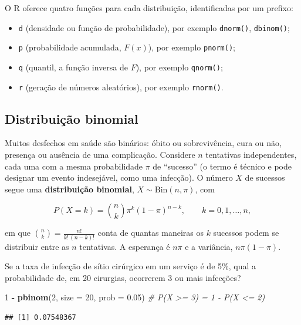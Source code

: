 \documentclass[
]{book}
\newenvironment{Shaded}{\begin{snugshade}}{\end{snugshade}}
\newcommand{\AttributeTok}[1]{\textcolor[rgb]{0.13,0.29,0.53}{#1}}
\newcommand{\CommentTok}[1]{\textcolor[rgb]{0.56,0.35,0.01}{\textit{#1}}}
\newcommand{\DecValTok}[1]{\textcolor[rgb]{0.00,0.00,0.81}{#1}}
\newcommand{\FloatTok}[1]{\textcolor[rgb]{0.00,0.00,0.81}{#1}}
\newcommand{\FunctionTok}[1]{\textcolor[rgb]{0.13,0.29,0.53}{\textbf{#1}}}
\newcommand{\NormalTok}[1]{#1}
\newcommand{\SpecialCharTok}[1]{\textcolor[rgb]{0.81,0.36,0.00}{\textbf{#1}}}
\providecommand{\tightlist}{%
  \setlength{\itemsep}{0pt}\setlength{\parskip}{0pt}}
\begin{document}
O R oferece quatro funções para cada distribuição, identificadas por um prefixo:

\begin{itemize}
\tightlist
\item
  \texttt{d} (densidade ou função de probabilidade), por exemplo \texttt{dnorm()}, \texttt{dbinom()};
\item
  \texttt{p} (probabilidade acumulada, \(F(x)\)), por exemplo \texttt{pnorm()};
\item
  \texttt{q} (quantil, a função inversa de \(F\)), por exemplo \texttt{qnorm()};
\item
  \texttt{r} (geração de números aleatórios), por exemplo \texttt{rnorm()}.
\end{itemize}

\subsection{Distribuição binomial}\label{distribuiuxe7uxe3o-binomial}

Muitos desfechos em saúde são binários: óbito ou sobrevivência, cura ou não, presença ou ausência de uma complicação. Considere \(n\) tentativas independentes, cada uma com a mesma probabilidade \(\pi\) de ``sucesso'' (o termo é técnico e pode designar um evento indesejável, como uma infecção). O número \(X\) de sucessos segue uma \textbf{distribuição binomial}, \(X \sim \text{Bin}(n, \pi)\), com

\[
P(X = k) = \binom{n}{k}\pi^k(1 - \pi)^{n-k}, \qquad k = 0, 1, \ldots, n,
\]

em que \(\binom{n}{k} = \frac{n!}{k!\,(n-k)!}\) conta de quantas maneiras os \(k\) sucessos podem se distribuir entre as \(n\) tentativas. A esperança é \(n\pi\) e a variância, \(n\pi(1 - \pi)\).

Se a taxa de infecção de sítio cirúrgico em um serviço é de 5\%, qual a probabilidade de, em 20 cirurgias, ocorrerem 3 ou mais infecções?

\begin{Shaded}
\begin{Highlighting}[]
\DecValTok{1} \SpecialCharTok{{-}} \FunctionTok{pbinom}\NormalTok{(}\DecValTok{2}\NormalTok{, }\AttributeTok{size =} \DecValTok{20}\NormalTok{, }\AttributeTok{prob =} \FloatTok{0.05}\NormalTok{)   }\CommentTok{\# P(X \textgreater{}= 3) = 1 {-} P(X \textless{}= 2)}
\end{Highlighting}
\end{Shaded}

\begin{verbatim}
## [1] 0.07548367
\end{verbatim}
\end{document}
